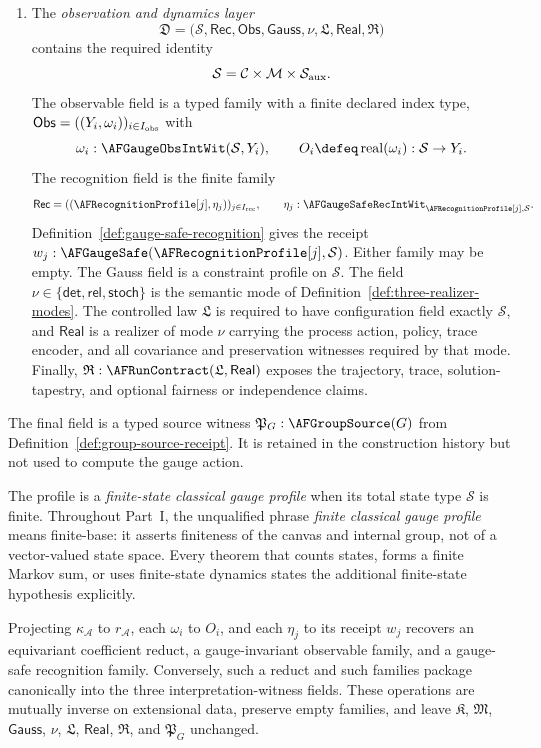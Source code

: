 \begin{definition}
\begin{enumerate}[label=\textup{(\roman*)},leftmargin=2.5em]
\item The \emph{observation and dynamics layer}
\[
 \mathfrak D=
 \bigl(\mathcal S,\mathsf{Rec},\mathsf{Obs},
       \mathsf{Gauss},\nu,
       \mathfrak L,\mathsf{Real},\mathfrak R\bigr)
\]
contains the required identity
\[
 \mathcal S=\mathcal C\times\mathcal M\times\mathcal S_{\rm aux}.
\]
The observable field is a typed family with a finite declared index type,
$\mathsf{Obs}=((Y_i,\omega_i))_{i\in I_{\rm obs}}$ with
\[
 \omega_i:\AFGaugeObsIntWit(\mathcal S,Y_i),
 \qquad O_i\defeq\operatorname{real}(\omega_i):\mathcal S\to Y_i.
\]
The recognition field is the finite family
\[
 \mathsf{Rec}=((\AFRecognitionProfile[j],\eta_j))_{j\in I_{\rm rec}},\qquad
 \eta_j:\AFGaugeSafeRecIntWit_{\AFRecognitionProfile[j],\mathcal S}.
\]
Definition~\ref{def:gauge-safe-recognition} gives the receipt
$w_j:\AFGaugeSafe(\AFRecognitionProfile[j],\mathcal S)$.  Either family may be empty.  The Gauss
field is a constraint profile on $\mathcal S$.  The field
$\nu\in\{\mathsf{det},\mathsf{rel},\mathsf{stoch}\}$ is the semantic mode of
Definition~\ref{def:three-realizer-modes}.  The controlled
law $\mathfrak L$ is required to have
configuration field exactly $\mathcal S$, and $\mathsf{Real}$ is a realizer
of mode $\nu$ carrying the process action, policy, trace encoder, and all
covariance and preservation witnesses required by that mode.  Finally,
$\mathfrak R:\AFRunContract(\mathfrak L,\mathsf{Real})$ exposes the trajectory,
trace, solution-tapestry, and optional fairness or independence claims.
\end{enumerate}
The final field is a typed source witness
$\mathfrak P_G:\AFGroupSource(G)$ from
Definition~\ref{def:group-source-receipt}.  It is retained in the construction
history but not used to compute the gauge action.

The profile is a \emph{finite-state classical gauge profile} when its total state type
$\mathcal S$ is finite.  Throughout Part~I, the unqualified phrase
\emph{finite classical gauge profile} means finite-base: it asserts finiteness of the
canvas and internal group, not of a vector-valued state space.  Every theorem
that counts states, forms a finite Markov sum, or uses finite-state dynamics
states the additional finite-state hypothesis explicitly.
\end{definition}

\begin{proposition}
\label{prop:gauge-profile-intwit-compatibility}
Projecting $\kappa_{\mathcal A}$ to $r_{\mathcal A}$, each $\omega_i$ to
$O_i$, and each $\eta_j$ to its receipt $w_j$ recovers an equivariant
coefficient reduct, a gauge-invariant observable family, and a gauge-safe
recognition family.  Conversely, such a reduct and such families package
canonically into the three interpretation-witness fields.  These operations
are mutually inverse on extensional data, preserve empty families, and leave
$\mathfrak K$, $\mathfrak M$, $\mathsf{Gauss}$, $\nu$, $\mathfrak L$,
$\mathsf{Real}$, $\mathfrak R$, and $\mathfrak P_G$ unchanged.
\end{proposition}

